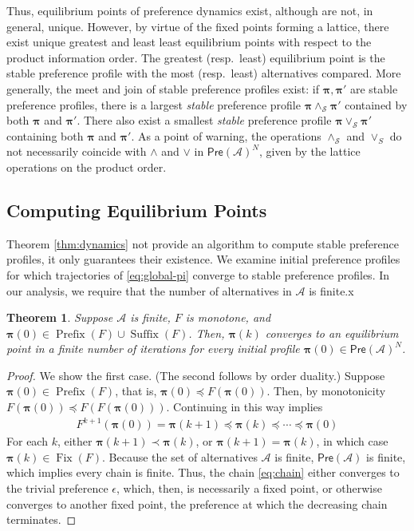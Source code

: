 \documentclass[conference]{ieeeconf}
\newcommand{\A}{\mathcal{A}}
\renewcommand{\S}{\mathcal{S}}
\newcommand{\Pref}{\mathsf{Pre}}
\newcommand{\profile}{\boldsymbol{\pi}}
\newcommand{\join}{\vee}
\newcommand{\meet}{\wedge}
\DeclareMathOperator{\Fix}{Fix}
\DeclareMathOperator{\Pre}{Prefix}
\DeclareMathOperator{\Post}{Suffix}
\newtheorem{theorem}{Theorem}
\begin{document}
Thus, equilibrium points of preference dynamics exist, although are not, in general, unique. However, by virtue of the fixed points forming a lattice, there exist unique greatest and least least equilibrium points with respect to the product information order. The greatest (resp.~least) equilibrium point is the stable preference profile with the most (resp.~least) alternatives compared. More generally, the meet and join of stable preference profiles exist: if $\profile, \profile'$ are stable preference profiles, there is a largest \emph{stable} preference profile $\profile \meet_{\S} \profile'$ contained by both $\profile$ and $\profile'$. There also exist a smallest \emph{stable} preference profile $\profile \join_{\S} \profile'$ containing both $\profile$ and $\profile'$. As a point of warning, the operations $\meet_\S$ and $\join_S$ do not necessarily coincide with $\meet$ and $\join$ in $\Pref(\A)^N$, given by the lattice operations on the product order.


\subsection{Computing Equilibrium Points}

Theorem \ref{thm:dynamics} not provide an algorithm to compute stable preference profiles, it only guarantees their existence. We examine initial preference profiles for which trajectories of \eqref{eq:global-pi} converge to stable preference profiles. In our analysis, we require that the number of alternatives in $\A$ is finite.x

\begin{theorem} \label{thm:initial-conditions}
    Suppose $\A$ is finite, $F$ is monotone, and $\profile(0) \in \Pre(F) \cup \Post(F)$. Then, $\profile(k)$ converges to an equilibrium point in a finite number of iterations for every initial profile $\profile(0) \in \Pref(\A)^N$.
\end{theorem}
\begin{proof}
    We show the first case. (The second follows by order duality.) Suppose $\profile(0) \in \Pre(F)$, that is, $\profile(0) \preceq F\left(\profile(0) \right)$. Then, by monotonicity $F(\profile(0)) \preceq F\left( F(\profile(0))\right)$. Continuing in this way implies
    \begin{align}
        F^{k+1}\left( \profile(0)\right)  = \profile(k+1) \preceq \profile(k) \preceq \cdots \preceq \profile(0) \label{eq:chain}
    \end{align} For each $k$, either $\profile(k+1) \prec \profile(k)$, or $\profile(k+1) = \profile(k)$, in which case $\profile(k) \in \Fix(F)$. Because the set of alternatives $\A$ is finite, $\Pref(\A)$ is finite, which implies every chain is finite. Thus, the chain \eqref{eq:chain} either converges to the trivial preference $\epsilon$, which, then, is necessarily a fixed point, or otherwise converges to another fixed point, the preference at which the decreasing chain terminates.
\end{proof}
\end{document}
